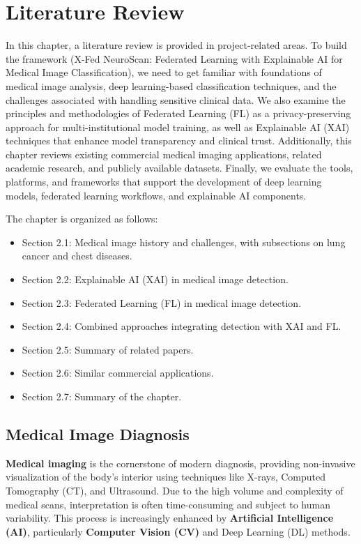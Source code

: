 \chapter{Literature Review}
\pagestyle{default}
\thispagestyle{default}

In this chapter, a literature review is provided in project-related areas. To build the framework (X-Fed NeuroScan: Federated Learning with Explainable AI for Medical Image Classification), we need to get familiar with foundations of medical image analysis, deep learning-based classification techniques, and the challenges associated with handling sensitive clinical data. We also examine the principles and methodologies of Federated Learning (FL) as a privacy-preserving approach for multi-institutional model training, as well as Explainable AI (XAI) techniques that enhance model transparency and clinical trust. Additionally, this chapter reviews existing commercial medical imaging applications, related academic research, and publicly available datasets. Finally, we evaluate the tools, platforms, and frameworks that support the development of deep learning models, federated learning workflows, and explainable AI components.

The chapter is organized as follows:

\begin{itemize}
	\item Section 2.1: Medical image history and challenges, with subsections on lung cancer and chest diseases.
	\item Section 2.2: Explainable AI (XAI) in medical image detection.
	\item Section 2.3: Federated Learning (FL) in medical image detection.
	\item Section 2.4: Combined approaches integrating detection with XAI and FL.
	\item Section 2.5: Summary of related papers.
	\item Section 2.6: Similar commercial applications.
	\item Section 2.7: Summary of the chapter.
\end{itemize}

\section{Medical Image Diagnosis}

\textbf{Medical imaging} is the cornerstone of modern diagnosis, providing non-invasive visualization of the body’s interior using techniques like X-rays, Computed Tomography (CT), and Ultrasound. Due to the high volume and complexity of medical scans, interpretation is often time-consuming and subject to human variability. This process is increasingly enhanced by \textbf{Artificial Intelligence (AI)}, particularly \textbf{Computer Vision (CV)} and Deep Learning (DL) methods.

